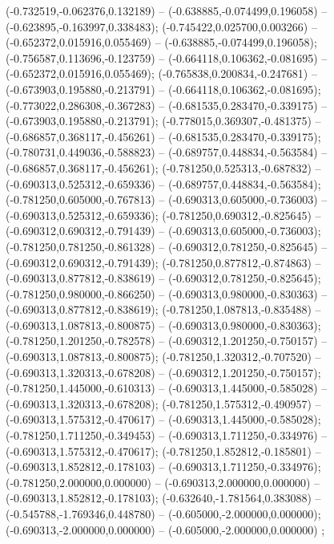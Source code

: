  (-0.732519,-0.062376,0.132189) -- (-0.638885,-0.074499,0.196058) -- (-0.623895,-0.163997,0.338483);
 (-0.745422,0.025700,0.003266) -- (-0.652372,0.015916,0.055469) -- (-0.638885,-0.074499,0.196058);
 (-0.756587,0.113696,-0.123759) -- (-0.664118,0.106362,-0.081695) -- (-0.652372,0.015916,0.055469);
 (-0.765838,0.200834,-0.247681) -- (-0.673903,0.195880,-0.213791) -- (-0.664118,0.106362,-0.081695);
 (-0.773022,0.286308,-0.367283) -- (-0.681535,0.283470,-0.339175) -- (-0.673903,0.195880,-0.213791);
 (-0.778015,0.369307,-0.481375) -- (-0.686857,0.368117,-0.456261) -- (-0.681535,0.283470,-0.339175);
 (-0.780731,0.449036,-0.588823) -- (-0.689757,0.448834,-0.563584) -- (-0.686857,0.368117,-0.456261);
 (-0.781250,0.525313,-0.687832) -- (-0.690313,0.525312,-0.659336) -- (-0.689757,0.448834,-0.563584);
 (-0.781250,0.605000,-0.767813) -- (-0.690313,0.605000,-0.736003) -- (-0.690313,0.525312,-0.659336);
 (-0.781250,0.690312,-0.825645) -- (-0.690312,0.690312,-0.791439) -- (-0.690313,0.605000,-0.736003);
 (-0.781250,0.781250,-0.861328) -- (-0.690312,0.781250,-0.825645) -- (-0.690312,0.690312,-0.791439);
 (-0.781250,0.877812,-0.874863) -- (-0.690313,0.877812,-0.838619) -- (-0.690312,0.781250,-0.825645);
 (-0.781250,0.980000,-0.866250) -- (-0.690313,0.980000,-0.830363) -- (-0.690313,0.877812,-0.838619);
 (-0.781250,1.087813,-0.835488) -- (-0.690313,1.087813,-0.800875) -- (-0.690313,0.980000,-0.830363);
 (-0.781250,1.201250,-0.782578) -- (-0.690312,1.201250,-0.750157) -- (-0.690313,1.087813,-0.800875);
 (-0.781250,1.320312,-0.707520) -- (-0.690313,1.320313,-0.678208) -- (-0.690312,1.201250,-0.750157);
 (-0.781250,1.445000,-0.610313) -- (-0.690313,1.445000,-0.585028) -- (-0.690313,1.320313,-0.678208);
 (-0.781250,1.575312,-0.490957) -- (-0.690313,1.575312,-0.470617) -- (-0.690313,1.445000,-0.585028);
 (-0.781250,1.711250,-0.349453) -- (-0.690313,1.711250,-0.334976) -- (-0.690313,1.575312,-0.470617);
 (-0.781250,1.852812,-0.185801) -- (-0.690313,1.852812,-0.178103) -- (-0.690313,1.711250,-0.334976);
 (-0.781250,2.000000,0.000000) -- (-0.690313,2.000000,0.000000) -- (-0.690313,1.852812,-0.178103);
 (-0.632640,-1.781564,0.383088) -- (-0.545788,-1.769346,0.448780) -- (-0.605000,-2.000000,0.000000);
 (-0.690313,-2.000000,0.000000) -- (-0.605000,-2.000000,0.000000) ;
